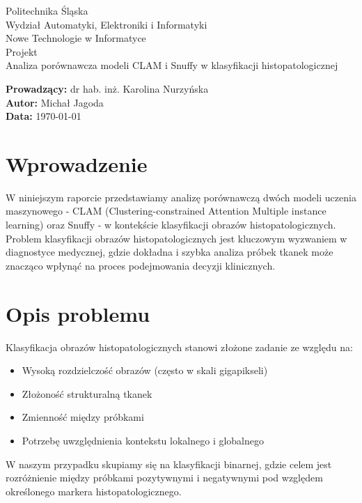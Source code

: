 \documentclass{article}
\begin{document}
\begin{titlepage}
    \centering
    {\LARGE Politechnika Śląska \\[0.5cm]}
    {\large Wydział Automatyki, Elektroniki i Informatyki \\[2cm]}
    {\Huge Nowe Technologie w Informatyce \\ Projekt \\[5cm]}
    {\LARGE Analiza porównawcza modeli CLAM i Snuffy w klasyfikacji histopatologicznej \\[2cm]}
    \vfill
    \begin{flushright}
        \textbf{Prowadzący:} dr hab. inż. Karolina Nurzyńska \\[0.5cm]
        \textbf{Autor:} Michał Jagoda \\[0.5cm]
        \textbf{Data:} \today
    \end{flushright}
\end{titlepage}

\section{Wprowadzenie}
W niniejszym raporcie przedstawiamy analizę porównawczą dwóch modeli uczenia maszynowego - CLAM (Clustering-constrained Attention Multiple instance learning) oraz Snuffy - w kontekście klasyfikacji obrazów histopatologicznych. Problem klasyfikacji obrazów histopatologicznych jest kluczowym wyzwaniem w diagnostyce medycznej, gdzie dokładna i szybka analiza próbek tkanek może znacząco wpłynąć na proces podejmowania decyzji klinicznych.

\section{Opis problemu}
Klasyfikacja obrazów histopatologicznych stanowi złożone zadanie ze względu na:
\begin{itemize}
    \item Wysoką rozdzielczość obrazów (często w skali gigapikseli)
    \item Złożoność strukturalną tkanek
    \item Zmienność między próbkami
    \item Potrzebę uwzględnienia kontekstu lokalnego i globalnego
\end{itemize}

W naszym przypadku skupiamy się na klasyfikacji binarnej, gdzie celem jest rozróżnienie między próbkami pozytywnymi i negatywnymi pod względem określonego markera histopatologicznego.
\end{document}
